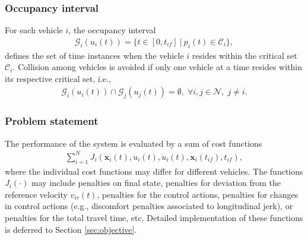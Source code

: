 \documentclass[letterpaper,10pt,conference]{ieeeconf}
\begin{document}
\subsubsection{Occupancy interval} For each vehicle $i$, the occupancy interval
\begin{align}
\mathcal{G}_i(u_i(t))=\{t \in [0,t_{if}]\ | \ p_{i}(t) \in \mathcal{C}_i\},
\end{align}
defines the set of time instances when the vehicle $i$ resides within the critical set $\mathcal{C}_i$. Collision among vehicles is avoided if only one vehicle at a time resides within its respective critical set, i.e.,
\begin{align}
\mathcal{G}_i(u_i(t)) \cap  \mathcal{G}_j(u_j(t))=\emptyset, \; \forall i,j \in \mathcal{N}, \; j \neq i.
\end{align}

\subsubsection{Problem statement} The performance of the system is evaluated by a sum of cost functions
\begin{align}
\sum_{i=1}^N J_i(\mathbf{x}_i(t),u_i(t),\dot u_i(t), \mathbf{x}_i(t_{if}), t_{if}),
\end{align}
where the individual cost functions may differ for different vehicles. The functions $J_i(\cdot)$ may include penalties on final state, penalties for deviation from the reference velocity $v_{ir}(t)$, penalties for the control actions, penalties for changes in control actions (e.g., discomfort penalties associated to longitudinal jerk), or penalties for the total travel time, etc. Detailed implementation of these functions is deferred to Section \ref{sec:objective}.
\end{document}
